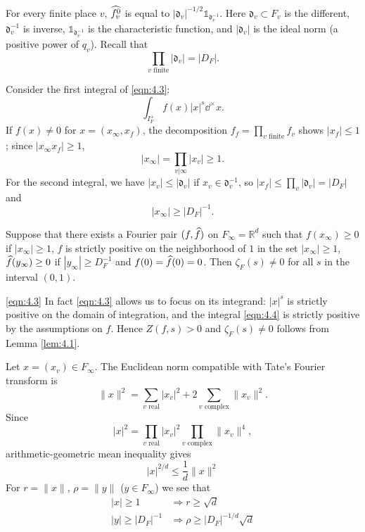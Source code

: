 For every finite place $v$, $\widehat{f_v^0}$ is equal to $|\mathfrak{d}_v|^{-1/2} \mathds{1}_{\mathfrak{d}_{v}^{-1}}$.
Here $\mathfrak{d}_v \subset F_v$ is the different, $\mathfrak{d}_v^{-1}$ is inverse, $\mathds{1}_{\mathfrak{d}_v^{-1}}$ is the characteristic function, and $|\mathfrak{d}_v|$ is the ideal norm (a positive power of $q_v$).
Recall that
\[
    \prod_{v\text{ finite}} |\mathfrak{d}_v| = |D_F|.
\]

Consider the first integral of \eqref{eqn:4.3}:
\begin{equation}
\label{eqn:4.4}
    \int_{I_F^+} f(x) |x|^{s} \dd^\times x.
\end{equation}
If $f(x) \neq 0$ for $x = (x_\infty, x_f)$, the decomposition $f_f = \prod_{v\text{ finite}}f_v$ shows $|x_f| \leq 1$; since $|x_\infty x_f| \geq 1$,
\begin{equation}
\label{eqn:4.5}
    |x_\infty| = \prod_{v | \infty} |x_v| \geq 1.
\end{equation}
For the second integral, we have $|x_v| \leq |\mathfrak{d}_v|$ if $x_v \in \mathfrak{d}_v^{-1}$, so $|x_f| \leq \prod_v |\mathfrak{d}_v| = |D_F|$ and
\begin{equation}
\label{eqn:4.6}
    |x_\infty| \geq |D_F|^{-1}.
\end{equation}

\begin{lemma}
\label{lem:4.2}
Suppose that there exists a Fourier pair $(f, \widehat{f})$ on $F_\infty = \mathbb{R}^{d}$ such that $f(x_\infty) \geq 0$ if $|x_\infty| \geq 1$, $f$ is strictly positive on the neighborhood of $1$ in the set $|x_\infty| \geq 1$, $\widehat{f}(y_\infty) \geq 0$ if $|y_\infty| \geq D_F^{-1}$ and $f(0) = \widehat{f}(0) = 0$.
Then $\zeta_F(s) \neq 0$ for all $s$ in the interval $(0, 1)$.
\end{lemma}

\eqref{eqn:4.3}
In fact \eqref{eqn:4.3} allows us to focus on its integrand: $|x|^s$ is strictly positive on the domain of integration, and the integral \eqref{eqn:4.4} is strictly positive by the assumptions on $f$.
Hence $Z(f, s) > 0$ and $\zeta_F(s) \neq 0$ follows from Lemma \ref{lem:4.1}.

Let $x = (x_v) \in F_\infty$.
The Euclidean norm compatible with Tate's Fourier transform is
\[
    \|x\|^{2} = \sum_{v\text{ real}} |x_v|^2 + 2 \sum_{v\text{ complex}} \|x_v\|^2.
\]
Since
\[
    |x|^{2} = \prod_{v\text{ real}} |x_v|^{2} \prod_{v\text{ complex}} \|x_v\|^{4},
\]
arithmetic-geometric mean inequality gives
\[
    |x|^{2/d} \leq \frac{1}{d}\|x\|^{2}
\]
For $r = \|x\|$, $\rho = \|y\|$ ($y \in F_\infty$) we see that
\begin{align*}
    |x| \geq 1 &\Rightarrow r \geq \sqrt{d} \\
    |y| \geq |D_F|^{-1} &\Rightarrow \rho \geq |D_F|^{-1/d} \sqrt{d}
\end{align*}

